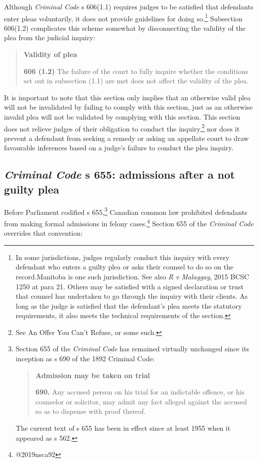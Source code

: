 Although \textit{Criminal Code} s 606(1.1) requires judges to be satisfied that defendants enter pleas voluntarily, it does not provide guidelines for doing so.\footnote{In some jurisdictions, judges regularly conduct this inquiry with every defendant who enters a guilty plea or asks their counsel to do so on the record.Manitoba is one such jurisdiction. See also \textit{R v Malaggay}, 2015 BCSC 1250 at para 21. Others may be satisfied with a signed declaration or trust that counsel has undertaken to go through the inquiry with their clients. As long as the judge is satisfied that the defendant's plea meets the statutory requirements, it also meets the technical requirements of the section.} Subsection 606(1.2) complicates this scheme somewhat by disconnecting the validity of the plea from the judicial inquiry:

\begin{quote}
    \onehalfspacing
    \textbf{Validity of plea}
    
    \textbf{606 (1.2)} The failure of the court to fully inquire whether the conditions set out in subsection (1.1) are met does not affect the validity of the plea.
\end{quote}

It is important to note that this section only implies that an otherwise valid plea will not be invalidated by failing to comply with this section, just as an otherwise invalid plea will not be validated by complying with this section. This section does not relieve judges of their obligation to conduct the inquiry,\footnote{See An Offer You Can't Refuse, or some such.} nor does it prevent a defendant from seeking a remedy or asking an appellate court to draw favourable inferences based on a judge's failure to conduct the plea inquiry.

\subsection{\textit{Criminal Code} s 655: admissions after a not guilty plea}

Before Parliament codified s 655,\footnote{Section 655 of the \textit{Criminal Code} has remained virtually unchanged since its inception as s 690 of the 1892 Criminal Code:

\begin{quote}
    \textbf{Admission may be taken on trial}
    
    \textbf{690.} Any accused person on his trial for an indictable offence, or his counselor or solicitor, may admit any fact alleged against the accused so as to dispense with proof thereof.
\end{quote}

The current text of s 655 has been in effect since at least 1955 when it appeared as s 562.} Canadian common law prohibited defendants from making formal admissions in felony cases.\footnote{@2019nsca92} Section 655 of the \textit{Criminal Code} overrides that convention:

